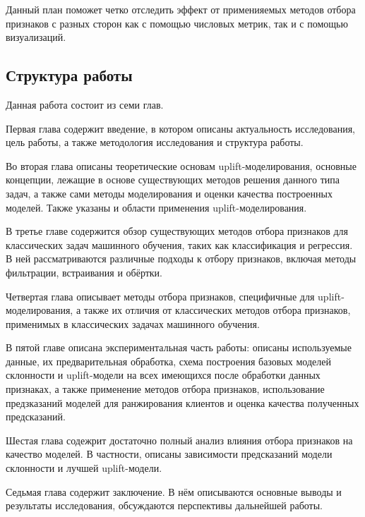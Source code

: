 Данный план поможет четко отследить эффект от применияемых методов отбора признаков с разных сторон как с помощью числовых метрик, так и с помощью визуализаций.





















\subsection{Структура работы}

Данная работа состоит из семи глав.

Первая глава содержит введение, в котором описаны актуальность исследования, цель работы, а также методология исследования и структура работы.

Во вторая глава описаны теоретические основам uplift-моделирования, основные концепции, лежащие в основе существующих методов решения данного типа задач, а также сами методы моделирования и оценки качества построенных моделей. Также указаны и области применения uplift-моделирования.

В третье главе содержится обзор существующих методов отбора признаков для классических задач машинного обучения, таких как классификация и регрессия. В ней рассматриваются различные подходы к отбору признаков, включая методы фильтрации, встраивания и обёртки.

Четвертая глава описывает методы отбора признаков, специфичные для uplift-моделирования, а также их отличия от классических методов отбора признаков, применимых в классических задачах машинного обучения.

В пятой главе описана экспериментальная часть работы: описаны используемые данные, их предварительная обработка, схема построения базовых моделей склонности и uplift-модели на всех имеющихся после обработки данных признаках, а также применение методов отбора признаков, использование предзказаний моделей для ранжирования клиентов и оценка качества полученных предсказаний.

Шестая глава содежрит достаточно полный анализ влияния отбора признаков на качество моделей. В частности, описаны зависимости предсказаний модели склонности и лучшей uplift-модели.

Седьмая глава содержит заключение. В нём описываются основные выводы и результаты исследования, обсуждаются перспективы дальнейшей работы.




